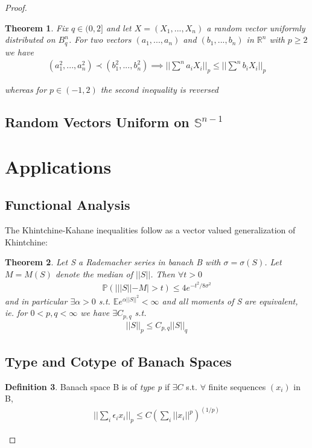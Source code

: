 \documentclass[10pt]{article}
\newcommand{\Pp}{\mathbb{P}}
\newcommand{\E}{\mathbb{E}}
\newcommand{\1}{\textbf{1}}
\newcommand{\R}{\mathbb{R}}
\newcommand{\norm}[1]{||#1||}
\newtheorem{theorem}{Theorem}
\theoremstyle{remark}
\theoremstyle{definition}
\newtheorem{defn}[theorem]{Definition}
\begin{document}
\begin{proof}
\begin{theorem}
	Fix $q \in (0,2]$ and let $X = (X_1,...,X_n)$ a random vector uniformly distributed on $B_q^n$. For two vectors $(a_1,...,a_n)$ and $(b_1,...,b_n)$ in $\R^n$ with $p \geq 2$ we have
	\begin{align*}
		(a_1^2,...,a_n^2) \prec (b_1^2,...,b_n^2) \implies ||\sum^n a_i X_i||_p \leq ||\sum^n b_i X_i||_p
	\end{align*}

	whereas for $p \in (-1,2)$ the second inequality is reversed
\end{theorem}




\subsection{Random Vectors Uniform on $\mathbb{S}^{n-1}$}

\section{Applications}

\subsection{Functional Analysis}

The Khintchine-Kahane inequalities follow as a vector valued generalization of Khintchine:

\begin{theorem}
	Let S a Rademacher series in banach B with $\sigma = \sigma(S)$. Let $M = M(S)$ denote the median of $\norm{S}$. Then $\forall t > 0$
	\begin{align*}
		\Pp (|\norm{S}- M| > t) \leq 4 e^{-t^2/8\sigma^2}
	\end{align*}
	and in particular $\exists \alpha > 0$ s.t. $\E e^{\alpha \norm{S}^2} < \infty$ and all moments of S are equivalent, ie. for $0 < p , q < \infty$ we have $\exists C_{p,q}$ s.t.
	\begin{align*}
		\norm{S}_p \leq C_{p,q} \norm{S}_q
	\end{align*}
\end{theorem}

\subsection{Type and Cotype of Banach Spaces}

\begin{defn}
	Banach space B is of \textit{type p} if $\exists C$ s.t. $\forall $ finite sequences $(x_i)$ in B,
	\begin{align*}
		\norm{\sum_i \epsilon_ix_i}_p \leq C (\sum_i \norm{x_i}^p)^{(1/p)}
	\end{align*}
\end{defn}


\end{proof}
\end{document}
